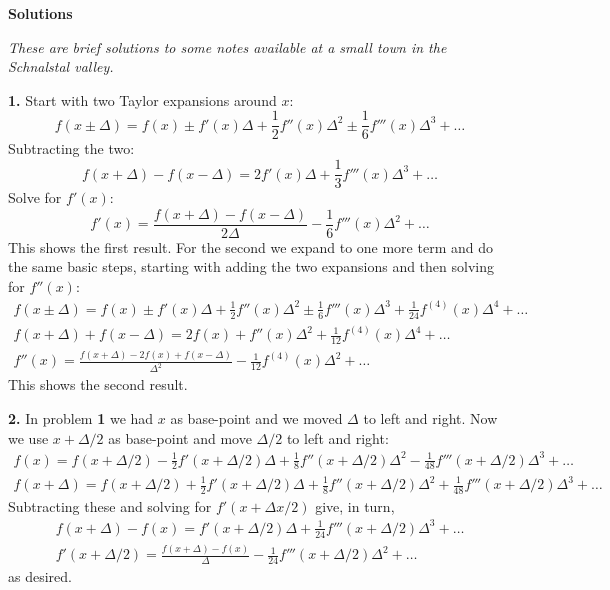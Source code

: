 \documentclass[10pt]{amsart}
\newcommand{\normalspacing}{\renewcommand{\baselinestretch}{1.05}
        \tiny\normalsize}
\newcommand{\prob}[1]{\bigskip\noindent\large\textbf{#1.}\normalsize }
\begin{document}
\Large\centerline{\textbf{Solutions}}

\medskip
\small
\centerline{\emph{These are brief solutions to some notes available at a small town in the Schnalstal valley.}}
\normalsize

\bigskip\bigskip

\thispagestyle{empty}
\normalspacing

\prob{1}  Start with two Taylor expansions around $x$:
    $$f(x\pm \Delta) = f(x) \pm f'(x) \Delta + \frac{1}{2} f''(x) \Delta^2 \pm \frac{1}{6} f'''(x) \Delta^3 + \dots$$
Subtracting the two:
    $$f(x+\Delta) - f(x-\Delta) = 2 f'(x) \Delta + \frac{1}{3} f'''(x) \Delta^3 + \dots$$
Solve for $f'(x)$:
    $$f'(x) = \frac{f(x+\Delta) - f(x-\Delta)}{2\Delta} - \frac{1}{6} f'''(x) \Delta^2 + \dots$$
This shows the first result.  For the second we expand to one more term and do the same basic steps, starting with adding the two expansions and then solving for $f''(x)$:
\begin{gather*}
    f(x\pm \Delta) = f(x) \pm f'(x) \Delta + \frac{1}{2} f''(x) \Delta^2 \pm \frac{1}{6} f'''(x) \Delta^3 + \frac{1}{24} f^{(4)}(x) \Delta^4 + \dots \\
    f(x + \Delta) + f(x - \Delta) = 2 f(x) + f''(x) \Delta^2 + \frac{1}{12} f^{(4)}(x) \Delta^4 + \dots \\
    f''(x) = \frac{f(x + \Delta) - 2 f(x) + f(x - \Delta)}{\Delta^2} - \frac{1}{12} f^{(4)}(x) \Delta^2 + \dots
\end{gather*}
This shows the second result.

\prob{2}  In problem \textbf{1} we had $x$ as base-point and we moved $\Delta$ to left and right.  Now we use $x+\Delta/2$ as base-point and move $\Delta/2$ to left and right:
\begin{gather*}
f(x) = f(x+\Delta/2) - \frac{1}{2} f'(x+\Delta/2) \Delta + \frac{1}{8} f''(x+\Delta/2) \Delta^2 - \frac{1}{48} f'''(x+\Delta/2) \Delta^3 + \dots \\
f(x+\Delta) = f(x+\Delta/2) + \frac{1}{2} f'(x+\Delta/2) \Delta + \frac{1}{8} f''(x+\Delta/2) \Delta^2 + \frac{1}{48} f'''(x+\Delta/2) \Delta^3 + \dots
\end{gather*}
Subtracting these and solving for $f'(x+\Delta x/2)$ give, in turn,
\begin{gather*}
f(x+\Delta) - f(x) = f'(x+\Delta/2) \Delta + \frac{1}{24} f'''(x+\Delta/2) \Delta^3 + \dots \\
f'(x+\Delta/2) = \frac{f(x+\Delta) - f(x)}{\Delta} - \frac{1}{24} f'''(x+\Delta/2) \Delta^2 + \dots
\end{gather*}
as desired.
\end{document}
